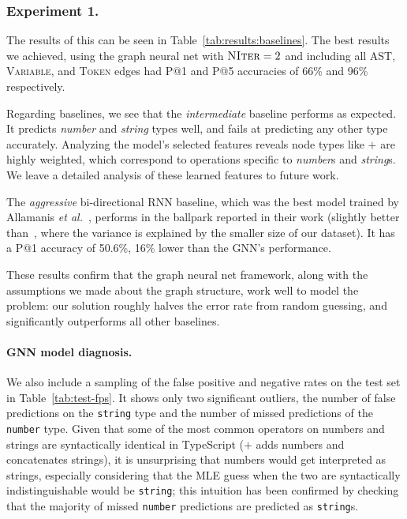 \subsubsection{Experiment 1.}
The results of this can be seen in Table~\ref{tab:results:baselines}.
The best results we achieved, using the graph neural net with $\textsc{NIter}=2$ and including all AST, \textsc{Variable}, and \textsc{Token} edges had P@1 and P@5 accuracies of 66\% and 96\% respectively.

Regarding baselines, we see that the \textit{intermediate} baseline performs as expected.
It predicts \textit{number} and \textit{string} types well, and fails at predicting any other type accurately.
Analyzing the model's selected features reveals node types like $+$ are highly weighted, which correspond to operations specific to \textit{number}s and \textit{string}s.
We leave a detailed analysis of these learned features to future work.

The \textit{aggressive} bi-directional RNN baseline, which was the best model trained by Allamanis \textit{et al.}~\cite{hellendoorn2018deep}, performs in the ballpark reported in their work (slightly better than~\cite{hellendoorn2018deep}, where the variance is explained by the smaller size of our dataset).
It has a P@1 accuracy of 50.6\%, 16\% lower than the GNN's performance.

These results confirm that the graph neural net framework, along with the assumptions we made about the graph structure, work well to model the problem: our solution roughly halves the error rate from random guessing, and significantly outperforms all other baselines.

\paragraph{GNN model diagnosis.}
We also include a sampling of the false positive and negative rates on the test set in Table~\ref{tab:test-fps}.
It shows only two significant outliers, the number of false predictions on the \texttt{string} type and the number of missed predictions of the \texttt{number} type.
Given that some of the most common operators on numbers and strings are syntactically identical in TypeScript ($+$ adds numbers and concatenates strings), it is unsurprising that numbers would get interpreted as strings, especially considering that the MLE guess when the two are syntactically indistinguishable would be \texttt{string}; this intuition has been confirmed by checking that the majority of missed \texttt{number} predictions are predicted as \texttt{string}s.

